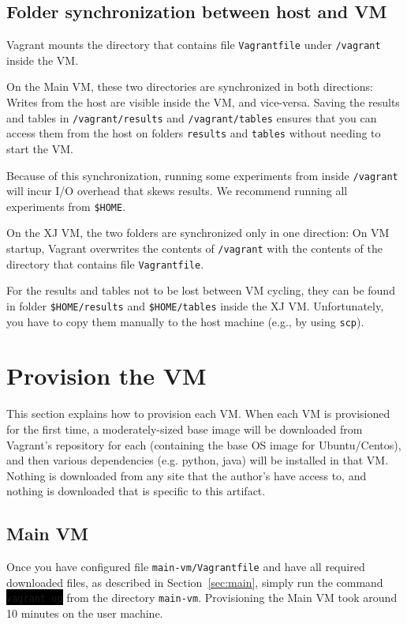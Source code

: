 \documentclass[12pt]{article}
\newcommand{\command}[1]{\colorbox{black}{\texttt{\color{white}#1}}}
\newcommand{\host}[1]{\colorbox{blue!20}{\texttt{\color{black}#1}}}
\newcommand{\vm}[1]{\colorbox{green!20}{\texttt{\color{black}#1}}}
\begin{document}
\subsection{Folder synchronization between host and VM}
\label{sec:sync}

Vagrant mounts the directory that contains file \host{Vagrantfile} under
\vm{/vagrant} inside the VM.

On the Main VM, these two directories are synchronized in both directions:
Writes from the host are visible inside the VM, and vice-versa.  Saving the
results and tables in \vm{/vagrant/results} and \vm{/vagrant/tables}
ensures that you can access them from the host on folders \host{results} and
\host{tables} without needing to start the VM.

Because of this synchronization, running some experiments from inside
\vm{/vagrant} will incur I/O overhead that skews results.  We recommend
running all experiments from \vm{\$HOME}.

On the XJ VM, the two folders are synchronized only in one direction:  On VM
startup, Vagrant overwrites the contents of \vm{/vagrant} with the contents
of the directory that contains file \host{Vagrantfile}.

For the results and tables not to be lost between VM cycling, they can be found
in folder \vm{\$HOME/results} and \vm{\$HOME/tables} inside the XJ VM.
Unfortunately, you have to copy them manually to the host machine (e.g., by
using \texttt{scp}).

\section{Provision the VM}
\label{sec:provision}

This section explains how to provision each VM. When each VM is provisioned for the first time, a moderately-sized base image will be downloaded from Vagrant's repository for each (containing the base OS image for Ubuntu/Centos), and then various dependencies (e.g. python, java) will be installed in that VM. Nothing is downloaded from any site that the author's have access to, and nothing is downloaded that is specific to this artifact.

\subsection{Main VM}

Once you have configured file \host{main-vm/Vagrantfile} and have all required
downloaded files, as described in Section~\ref{sec:main}, simply run the command
\command{vagrant up} from the directory \host{main-vm}.  Provisioning the Main VM took around 10
minutes on the user machine.
\end{document}
